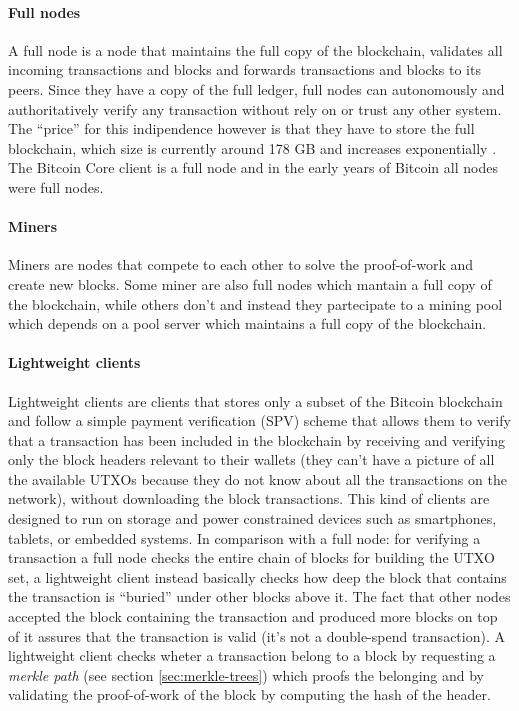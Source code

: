 \paragraph{Full nodes} A full node is a node that maintains the full copy of the
blockchain, validates all incoming transactions and blocks and forwards
transactions and blocks to its peers. Since they have a copy of the full ledger,
full nodes can autonomously and authoritatively verify any transaction without
rely on or trust any other system. The ``price'' for this indipendence however
is that they have to store the full blockchain, which size is currently around
178 GB and increases exponentially \cite{statista}. The Bitcoin Core client
is a full node and in the early years of Bitcoin all nodes were full nodes.

\paragraph{Miners} Miners are nodes that compete to each other to solve the
proof-of-work and create new blocks. Some miner are also full nodes which
mantain a full copy of the blockchain, while others don't and instead they
partecipate to a mining pool which depends on a pool server which maintains a
full copy of the blockchain.

\paragraph{Lightweight clients} Lightweight clients are clients that stores only
a subset of the Bitcoin blockchain and follow a simple payment verification
(SPV) scheme that allows them to verify that a transaction has been included in
the blockchain by receiving and verifying only the block headers relevant to
their wallets (they can't have a picture of all the available UTXOs because they
do not know about all the transactions on the network), without downloading the
block transactions. This kind of clients are designed to run on storage and
power constrained devices such as smartphones, tablets, or embedded systems. In
comparison with a full node: for verifying a transaction a full node checks the
entire chain of blocks for building the UTXO set, a lightweight client instead
basically checks how deep the block that contains the transaction is ``buried''
under other blocks above it. The fact that other nodes accepted the block
containing the transaction and produced more blocks on top of it assures that
the transaction is valid (it's not a double-spend transaction). A lightweight
client checks wheter a transaction belong to a block by requesting a
\emph{merkle path} (see section \ref{sec:merkle-trees}) which proofs the
belonging and by validating the proof-of-work of the block by computing the hash
of the header.

